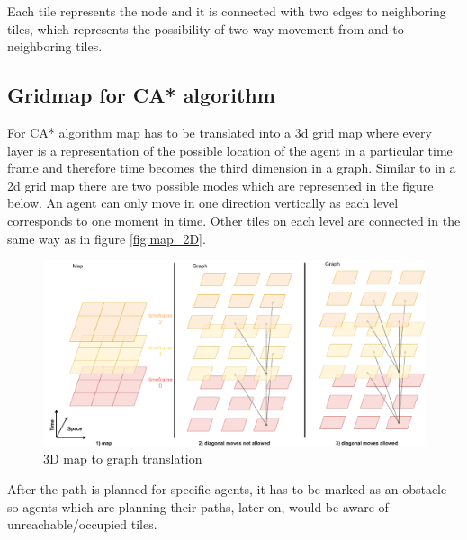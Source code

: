Each tile represents the node and it is connected with two edges to neighboring tiles, which represents the possibility of two-way movement from and to neighboring tiles. 


\subsection{Gridmap for CA* algorithm}
For CA* algorithm map has to be translated into a 3d grid map where every layer is a representation of the possible location of the agent in a particular time frame and therefore time becomes the third dimension in a graph. Similar to in a 2d grid map there are two possible modes which are represented in the figure below. An agent can only move in one direction vertically as each level corresponds to one moment in time. Other tiles on each level are connected in the same way as in figure \ref{fig:map_2D}.
\begin{figure}[H]
    \centering
    \includegraphics[width=\textwidth]{pictures/map_3D.png}
    \caption{3D map to graph translation}
    \label{fig:map_3D}
\end{figure}
After the path is planned for specific agents, it has to be marked as an obstacle so agents which are planning their paths, later on, would be aware of unreachable/occupied tiles.

